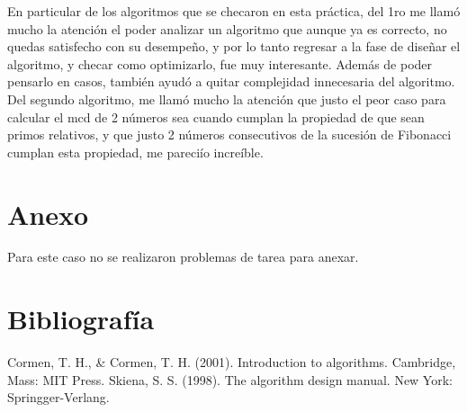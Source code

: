 \documentclass[12pt,twoside]{article}
\begin{document}
En particular de los algoritmos que se checaron en esta pr\'actica, del 1ro me llam\'o mucho la atenci\'on el 
poder analizar un algoritmo que aunque ya es correcto, no quedas satisfecho con su desempeño, y por lo tanto regresar a la fase de diseñar el algoritmo, y checar como optimizarlo, fue muy interesante. Adem\'as de poder pensarlo en casos, tambi\'en ayud\'o a quitar complejidad innecesaria del algoritmo. Del segundo algoritmo, me llam\'o mucho la atenci\'on que justo el peor caso para calcular el mcd de 2 n\'umeros sea cuando cumplan la propiedad de que sean primos relativos, y que justo 2
n\'umeros consecutivos de la sucesi\'on de Fibonacci cumplan esta propiedad, me pareci\'io incre\'ible.

\section{Anexo}
Para este caso no se realizaron problemas de tarea para anexar.

\section{Bibliograf\'ia}

Cormen, T. H., \& Cormen, T. H. (2001). Introduction to algorithms. Cambridge, Mass: MIT Press.
\newline
Skiena, S. S. (1998). The algorithm design manual. New York: Springger-Verlang.
\medskip
\end{document}
